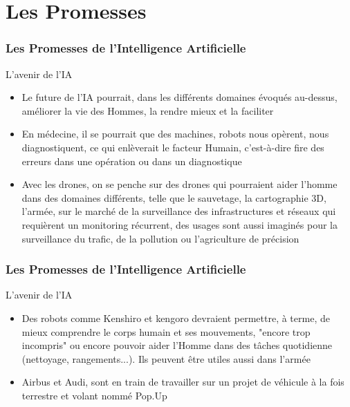 \documentclass{beamer}
\begin{document}
	
	\section{Les Promesses}
	\begin{frame}
	\frametitle{Les Promesses de l'Intelligence Artificielle}
	\begin{block}{L'avenir de l'IA}
	\begin{itemize}
	\itemsep1em
		\item Le future de l'IA pourrait, dans les différents domaines évoqués au-dessus, améliorer la vie des Hommes, la rendre mieux et la faciliter
		\item En médecine, il se pourrait que des machines, robots nous opèrent, nous diagnostiquent, ce qui enlèverait le facteur Humain, c'est-à-dire fire des erreurs dans une opération ou dans un diagnostique
		\item Avec les drones, on se penche sur des drones qui pourraient aider l'homme dans des domaines différents, telle que le sauvetage, la cartographie 3D, l'armée, sur le marché de la surveillance des infrastructures et réseaux qui requièrent un monitoring récurrent, %
		des usages sont aussi imaginés pour la surveillance du trafic, de la pollution ou l'agriculture de précision
	\end{itemize}
	\end{block}
	\end{frame}	
	
	\begin{frame}
	\frametitle{Les Promesses de l'Intelligence Artificielle}
	\begin{block}{L'avenir de l'IA}
	\begin{itemize}
	\itemsep1em
		\item Des robots comme Kenshiro et kengoro devraient permettre, à terme, de mieux comprendre le corps humain et ses mouvements, "encore trop incompris" ou encore pouvoir aider l'Homme dans des tâches quotidienne (nettoyage, rangements...). Ils peuvent être utiles aussi dans l'armée
		\item Airbus et Audi, sont en train de travailler sur un projet de véhicule à la fois terrestre et volant nommé Pop.Up
	\end{itemize}
	\end{block}
	\end{frame}
	
\end{document}
